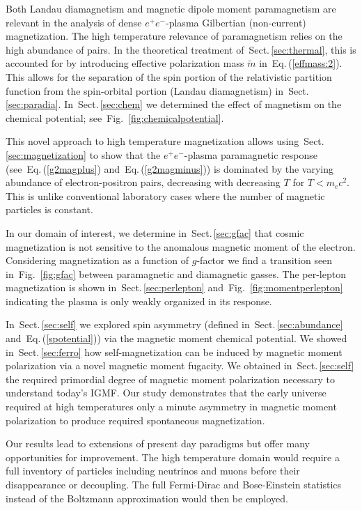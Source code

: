 \documentclass[aps,prd,floatfix,reprint]{revtex4-2}
\newcommand{\req}[1]{Eq.\,(\ref{#1})}
\newcommand{\rf}[1]{Fig.~{\ref{#1}}}
\newcommand{\rsec}[1]{Sect.\,{\ref{#1}}}
\begin{document}
Both Landau diamagnetism and magnetic dipole moment paramagnetism are relevant in the analysis of dense $e^{+}e^{-}$-plasma Gilbertian (non-current) magnetization. The high temperature relevance of paramagnetism relies on the high abundance of pairs. In the theoretical treatment of~\rsec{sec:thermal}, this is accounted for by introducing effective polarization mass $\tilde{m}$ in~\req{effmass:2}. This allows for the separation of the spin portion of the relativistic partition function from the spin-orbital portion (Landau diamagnetism) in~\rsec{sec:paradia}. In~\rsec{sec:chem} we determined the effect of magnetism on the chemical potential; 
see~\rf{fig:chemicalpotential}.

This novel approach to high temperature magnetization allows using~\rsec{sec:magnetization} to show that the $e^{+}e^{-}$-plasma paramagnetic response (see~\req{g2magplus} and~\req{g2magminus}) is dominated by the varying abundance of electron-positron pairs, decreasing with decreasing $T$ for $T<m_{e}c^2$. This is unlike conventional laboratory cases where the number of magnetic particles is constant. 

In our domain of interest, we determine in~\rsec{sec:gfac} that cosmic magnetization is not sensitive to the anomalous magnetic moment of the electron. Considering magnetization as a function of $g$-factor we find a transition seen in~\rf{fig:gfac} between paramagnetic and diamagnetic gasses. The per-lepton magnetization is shown in~\rsec{sec:perlepton} and~\rf{fig:momentperlepton} indicating the plasma is only weakly organized in its response.

In~\rsec{sec:self} we explored spin asymmetry (defined in~\rsec{sec:abundance} and~\req{spotential}) via the magnetic moment  chemical potential. We showed in~\rsec{sec:ferro} how self-magnetization can be induced by magnetic moment polarization via a novel magnetic moment fugacity. We obtained in~\rsec{sec:self} the required primordial degree of magnetic moment polarization necessary to understand today's IGMF. Our study demonstrates that the early universe required at high temperatures only a minute asymmetry in magnetic moment polarization to produce required spontaneous magnetization.

Our results lead to extensions of present day paradigms but offer many opportunities for improvement. The high temperature domain would require a full inventory of particles including neutrinos and muons before their disappearance or decoupling. The full Fermi-Dirac and Bose-Einstein statistics instead of the Boltzmann approximation would then be employed. 
\end{document}
